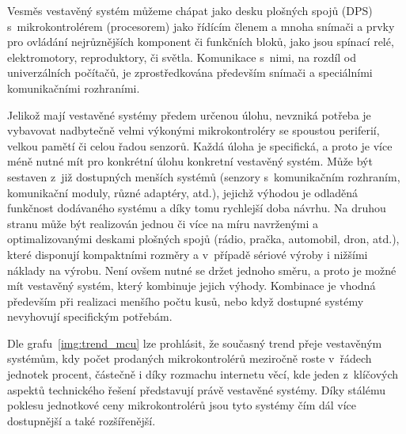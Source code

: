         Vesměs vestavěný systém můžeme chápat jako desku plošných spojů (DPS) s~mikrokontrolérem (procesorem) jako řídícím členem a mnoha snímači a prvky pro ovládání nejrůznějších komponent či funkčních bloků, jako jsou spínací relé, elektromotory, reproduktory, či světla. Komunikace s~nimi, na rozdíl od univerzálních počítačů, je zprostředkována především snímači a speciálními komunikačními rozhraními.
    
        Jelikož mají vestavěné systémy předem určenou úlohu, nevzniká potřeba je vybavovat nadbytečně velmi výkonými mikrokontroléry se spoustou periferií, velkou pamětí či celou řadou senzorů. Každá úloha je specifická, a proto je více méně nutné mít pro konkrétní úlohu konkretní vestavěný systém. Může být sestaven z~již dostupných menších systémů (senzory s~komunikačním rozhraním, komunikační moduly, různé adaptéry, atd.), jejichž výhodou je odladěná funkčnost dodávaného systému a díky tomu rychlejší doba návrhu. Na druhou stranu může být realizován jednou či více na míru navrženými a optimalizovanými deskami plošných spojů (rádio, pračka, automobil, dron, atd.), které disponují kompaktními rozměry a v~případě sériové výroby i nižšími náklady na výrobu. Není ovšem nutné se držet jednoho směru, a proto je možné mít vestavěný systém, který kombinuje jejich výhody. Kombinace je vhodná především při realizaci menšího počtu kusů, nebo když dostupné systémy nevyhovují specifickým potřebám.

        Dle grafu~\ref{img:trend_mcu} lze prohlásit, že současný trend přeje vestavěným systémům, kdy počet prodaných mikrokontrolérů meziročně roste v~řádech jednotek procent, částečně i díky rozmachu internetu věcí, kde jeden z~klíčových aspektů technického řešení představují právě vestavěné systémy. Díky stálému poklesu jednotkové ceny mikrokontrolérů jsou tyto systémy čím dál více dostupnější a také rozšířenější.

